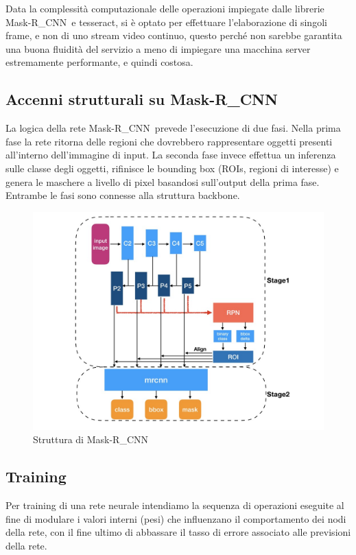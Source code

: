 \documentclass[12pt,a4paper]{article}
\newcommand{\mrcnn}{Mask-R\_CNN}
\begin{document}
Data la complessità computazionale delle operazioni impiegate
dalle librerie \mrcnn\ e tesseract, si è optato per effettuare
l'elaborazione di singoli frame, e non di uno stream video
continuo, questo perché non sarebbe garantita una buona fluidità
del servizio a meno di impiegare una macchina server estremamente
performante, e quindi costosa.

\subsection{Accenni strutturali su \mrcnn}

La logica della rete \mrcnn\ prevede l'esecuzione di due fasi. Nella
prima fase la rete ritorna delle regioni che dovrebbero rappresentare
oggetti presenti all'interno dell'immagine di input. La seconda fase
invece effettua un inferenza sulle classe degli oggetti, rifinisce le
bounding box (ROIs, regioni di interesse) e genera le maschere a livello
di pixel basandosi sull'output della prima fase. Entrambe le fasi sono
connesse alla struttura backbone.

\begin{figure}[H]
    \caption{Struttura di \mrcnn}
    \centering
    \includegraphics[width=\textwidth,height=\textheight,keepaspectratio]{mask_description.jpg}
\end{figure}

\subsection{Training}
\label{s:training}

Per training di una rete neurale intendiamo la sequenza di operazioni
eseguite al fine di modulare i valori interni (pesi) che influenzano il
comportamento dei nodi della rete, con il fine ultimo di abbassare il
tasso di errore associato alle previsioni della rete.
\end{document}
